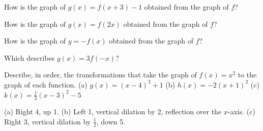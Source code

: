 \begin{exo}{}
How is the graph of $g(x)=f(x+3)-1$ obtained from the graph of $f$?
\end{exo}
\begin{exo}{}
How is the graph of $g(x)=f(2x)$ obtained from the graph of $f$?
\end{exo}
\begin{exo}{}
How is the graph of $y=-f(x)$ obtained from the graph of $f$?
\end{exo}
\begin{exo}{}
Which describes $g(x)=3f(-x)$?
\end{exo}
\begin{exo}{}
Describe, in order, the transformations that take the graph of $f(x)=x^2$ to the graph of each function.
(a) $g(x)=(x-4)^2+1$ \quad (b) $h(x)=-2(x+1)^2$ \quad (c) $k(x)=\frac12(x-3)^2-5$
\begin{solution}
(a) Right 4, up 1. (b) Left 1, vertical dilation by 2, reflection over the $x$-axis. (c) Right 3, vertical dilation by $\frac12$, down 5.
\end{solution}
\end{exo}

